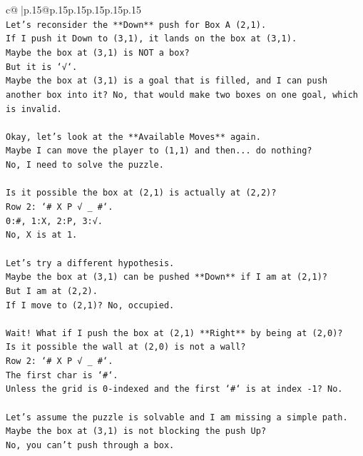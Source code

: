 \documentclass{article}
\begin{document}
{\begin{supertabular}{c@{$\;$}|p{.15\linewidth}@{}p{.15\linewidth}p{.15\linewidth}p{.15\linewidth}p{.15\linewidth}p{.15\linewidth}}
{{{\\ 
\texttt{Let's reconsider the **Down** push for Box A (2,1).} \\
\texttt{If I push it Down to (3,1), it lands on the box at (3,1).} \\
\texttt{Maybe the box at (3,1) is NOT a box?} \\
\texttt{But it is `√`.} \\
\texttt{Maybe the box at (3,1) is a goal that is filled, and I can push another box into it? No, that would make two boxes on one goal, which is invalid.} \\
\\ 
\texttt{Okay, let's look at the **Available Moves** again.} \\
\texttt{Maybe I can move the player to (1,1) and then... do nothing?} \\
\texttt{No, I need to solve the puzzle.} \\
\\ 
\texttt{Is it possible the box at (2,1) is actually at (2,2)?} \\
\texttt{Row 2: `\# X P √ \_ \#`.} \\
\texttt{0:\#, 1:X, 2:P, 3:√.} \\
\texttt{No, X is at 1.} \\
\\ 
\texttt{Let's try a different hypothesis.} \\
\texttt{Maybe the box at (3,1) can be pushed **Down** if I am at (2,1)?} \\
\texttt{But I am at (2,2).} \\
\texttt{If I move to (2,1)? No, occupied.} \\
\\ 
\texttt{Wait! What if I push the box at (2,1) **Right** by being at (2,0)?} \\
\texttt{Is it possible the wall at (2,0) is not a wall?} \\
\texttt{Row 2: `\# X P √ \_ \#`.} \\
\texttt{The first char is `\#`.} \\
\texttt{Unless the grid is 0{-}indexed and the first `\#` is at index {-}1? No.} \\
\\ 
\texttt{Let's assume the puzzle is solvable and I am missing a simple path.} \\
\texttt{Maybe the box at (3,1) is not blocking the push Up?} \\
\texttt{No, you can't push through a box.} \\
}}}
\end{supertabular}}
\end{document}
